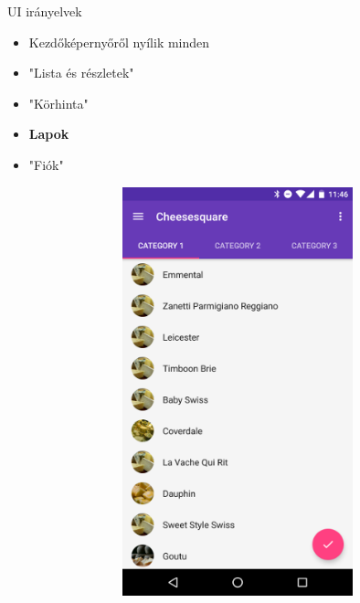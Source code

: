 \documentclass{beamer}
\begin{document}
\begin{frame}[fragile]{UI irányelvek}
	\begin{minipage}{0.34\textwidth}
		\begin{itemize}
			\item Kezdőképernyőről nyílik minden 
			\item "Lista és részletek"
			\item "Körhinta"
			\item \textbf{Lapok}
			\item "Fiók"
		\end{itemize}
	\end{minipage}
	\begin{minipage}{0.65\textwidth}
		\begin{itemize}
			\includegraphics[width=1\linewidth]{figures/viewpagertabs.png}
		\end{itemize}
	\end{minipage}
\end{frame}
\end{document}

